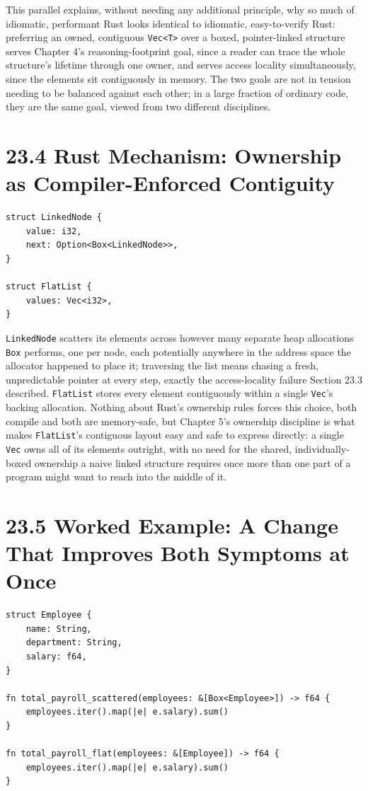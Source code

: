 \documentclass[11pt]{book}
\begin{document}
This parallel explains, without needing any additional principle, why so much of idiomatic, performant Rust looks identical to idiomatic, easy-to-verify Rust: preferring an owned, contiguous \texttt{Vec<T>} over a boxed, pointer-linked structure serves Chapter 4's reasoning-footprint goal, since a reader can trace the whole structure's lifetime through one owner, and serves access locality simultaneously, since the elements sit contiguously in memory. The two goals are not in tension needing to be balanced against each other; in a large fraction of ordinary code, they are the same goal, viewed from two different disciplines.

\section*{23.4 Rust Mechanism: Ownership as Compiler-Enforced Contiguity}

\begin{lstlisting}
struct LinkedNode {
    value: i32,
    next: Option<Box<LinkedNode>>,
}

struct FlatList {
    values: Vec<i32>,
}
\end{lstlisting}

\texttt{LinkedNode} scatters its elements across however many separate heap allocations \texttt{Box} performs, one per node, each potentially anywhere in the address space the allocator happened to place it; traversing the list means chasing a fresh, unpredictable pointer at every step, exactly the access-locality failure Section 23.3 described. \texttt{FlatList} stores every element contiguously within a single \texttt{Vec}'s backing allocation. Nothing about Rust's ownership rules forces this choice, both compile and both are memory-safe, but Chapter 5's ownership discipline is what makes \texttt{FlatList}'s contiguous layout easy and safe to express directly: a single \texttt{Vec} owns all of its elements outright, with no need for the shared, individually-boxed ownership a naive linked structure requires once more than one part of a program might want to reach into the middle of it.

\section*{23.5 Worked Example: A Change That Improves Both Symptoms at Once}

\begin{lstlisting}
struct Employee {
    name: String,
    department: String,
    salary: f64,
}

fn total_payroll_scattered(employees: &[Box<Employee>]) -> f64 {
    employees.iter().map(|e| e.salary).sum()
}

fn total_payroll_flat(employees: &[Employee]) -> f64 {
    employees.iter().map(|e| e.salary).sum()
}
\end{lstlisting}
\end{document}
